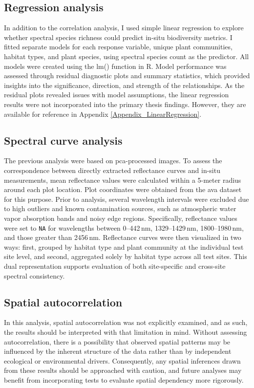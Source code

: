 \subsection{Regression analysis}
In addition to the correlation analysis, I used simple linear regression to explore whether spectral species richness could predict in-situ biodiversity metrics. I fitted separate models for each response variable, unique plant communities, habitat types, and plant species, using spectral species count as the predictor. All models were created using the lm() function in R. Model performance was assessed through residual diagnostic plots and summary statistics, which provided insights into the significance, direction, and strength of the relationships. As the residual plots revealed issues with model assumptions, the linear regression results were not incorporated into the primary thesis findings. However, they are available for reference in Appendix \ref{Appendix_LinearRegression}.

\subsection{Spectral curve analysis}
The previous analysis were based on \ac{pca}-processed images. To assess the correspondence between directly extracted reflectance curves and in-situ measurements, mean reflectance values were calculated within a 5-meter radius around each plot location. Plot coordinates were obtained from the \ac{ava} dataset for this purpose. Prior to analysis, several wavelength intervals were excluded due to high outliers and known contamination sources, such as atmospheric water vapor absorption bands and noisy edge regions. Specifically, reflectance values were set to \texttt{NA} for wavelengths between 0–442\,nm, 1329–1429\,nm, 1800–1980\,nm, and those greater than 2456\,nm. Reflectance curves were then visualized in two ways: first, grouped by habitat type and plant community at the individual test site level, and second, aggregated solely by habitat type across all test sites. This dual representation supports evaluation of both site-specific and cross-site spectral consistency.


\subsection{Spatial autocorrelation}
In this analysis, spatial autocorrelation was not explicitly examined, and as such, the results should be interpreted with that limitation in mind. Without assessing autocorrelation, there is a possibility that observed spatial patterns may be influenced by the inherent structure of the data rather than by independent ecological or environmental drivers. Consequently, any spatial inferences drawn from these results should be approached with caution, and future analyses may benefit from incorporating tests to evaluate spatial dependency more rigorously.